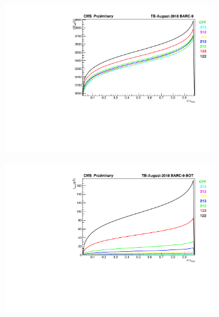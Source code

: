 	\begin{figure}
    	\begin{subfigure}{\linewidth}
			\centering
    		\includegraphics[width = \linewidth]{fig/chapt5/Inv-HVeff-Graph-BARC-9.pdf}
        	\caption{\label{fig:august-sig-inv:A}}
    	\end{subfigure}
    	\begin{subfigure}{\linewidth}
			\centering
    		\includegraphics[width = \linewidth]{fig/chapt5/Inv-Imon-Graph-BARC-9-BOT.pdf}
        	\caption{\label{fig:august-sig-inv:B}}
    	\end{subfigure}
    	\begin{subfigure}{\linewidth}
			\centering

\end{subfigure}
\end{figure}
